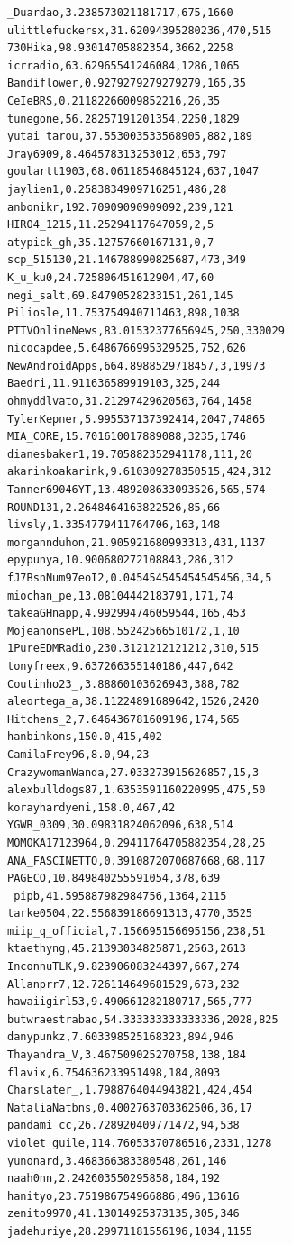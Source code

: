 \begin{verbatim}
_Duardao,3.238573021181717,675,1660
ulittlefuckersx,31.62094395280236,470,515
730Hika,98.93014705882354,3662,2258
icrradio,63.62965541246084,1286,1065
Bandiflower,0.9279279279279279,165,35
CeIeBRS,0.21182266009852216,26,35
tunegone,56.28257191201354,2250,1829
yutai_tarou,37.553003533568905,882,189
Jray6909,8.464578313253012,653,797
goulartt1903,68.06118546845124,637,1047
jaylien1,0.2583834909716251,486,28
anbonikr,192.70909090909092,239,121
HIRO4_1215,11.25294117647059,2,5
atypick_gh,35.12757660167131,0,7
scp_515130,21.146788990825687,473,349
K_u_ku0,24.725806451612904,47,60
negi_salt,69.84790528233151,261,145
Piliosle,11.753754940711463,898,1038
PTTVOnlineNews,83.01532377656945,250,330029
nicocapdee,5.6486766995329525,752,626
NewAndroidApps,664.8988529718457,3,19973
Baedri,11.911636589919103,325,244
ohmyddlvato,31.21297429620563,764,1458
TylerKepner,5.995537137392414,2047,74865
MIA_CORE,15.701610017889088,3235,1746
dianesbaker1,19.705882352941178,111,20
akarinkoakarink,9.610309278350515,424,312
Tanner69046YT,13.489208633093526,565,574
ROUND131,2.2648464163822526,85,66
livsly,1.3354779411764706,163,148
morgannduhon,21.905921680993313,431,1137
epypunya,10.900680272108843,286,312
fJ7BsnNum97eoI2,0.045454545454545456,34,5
miochan_pe,13.08104442183791,171,74
takeaGHnapp,4.992994746059544,165,453
MojeanonsePL,108.55242566510172,1,10
1PureEDMRadio,230.3121212121212,310,515
tonyfreex,9.637266355140186,447,642
Coutinho23_,3.88860103626943,388,782
aleortega_a,38.11224891689642,1526,2420
Hitchens_2,7.646436781609196,174,565
hanbinkons,150.0,415,402
CamilaFrey96,8.0,94,23
CrazywomanWanda,27.033273915626857,15,3
alexbulldogs87,1.6353591160220995,475,50
korayhardyeni,158.0,467,42
YGWR_0309,30.09831824062096,638,514
MOMOKA17123964,0.29411764705882354,28,25
ANA_FASCINETTO,0.3910872070687668,68,117
PAGECO,10.849840255591054,378,639
_pipb,41.595887982984756,1364,2115
tarke0504,22.556839186691313,4770,3525
miip_q_official,7.156695156695156,238,51
ktaethyng,45.21393034825871,2563,2613
InconnuTLK,9.823906083244397,667,274
Allanprr7,12.726114649681529,673,232
hawaiigirl53,9.490661282180717,565,777
butwraestrabao,54.333333333333336,2028,825
danypunkz,7.603398525168323,894,946
Thayandra_V,3.467509025270758,138,184
flavix,6.754636233951498,184,8093
Charslater_,1.7988764044943821,424,454
NataliaNatbns,0.4002763703362506,36,17
pandami_cc,26.728920409771472,94,538
violet_guile,114.76053370786516,2331,1278
yunonard,3.468366383380548,261,146
naah0nn,2.242603550295858,184,192
hanityo,23.751986754966886,496,13616
zenito9970,41.13014925373135,305,346
jadehuriye,28.29971181556196,1034,1155

\end{verbatim}

